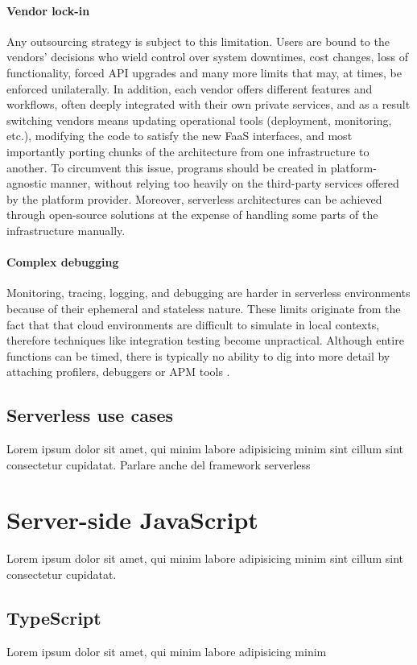 \paragraph{\textbf{Vendor lock-in}} Any outsourcing strategy is subject to this limitation.
Users are bound to the vendors' decisions who wield control over
system downtimes, cost changes, loss of functionality, forced API upgrades and many
more limits that may, at times, be enforced unilaterally.
In addition, each vendor offers different features and workflows,
often deeply integrated with their own private services,
and as a result switching vendors means updating operational tools (deployment, monitoring, etc.),
modifying the code to satisfy the new FaaS interfaces, and most importantly
porting chunks of the architecture from one infrastructure to another.
To circumvent this issue, programs should be created in platform-agnostic manner,
without relying too heavily on the third-party services offered by the platform provider.
Moreover, serverless architectures can be achieved through open-source solutions
at the expense of handling some parts of the infrastructure manually.

\paragraph{\textbf{Complex debugging}} Monitoring, tracing, logging, and debugging
are harder in serverless environments because of their ephemeral and stateless nature.
These limits originate from the fact that that cloud environments are difficult
to simulate in local contexts, therefore techniques like integration testing become unpractical.
Although entire functions can be timed, there is typically no
ability to dig into more detail by attaching profilers, debuggers or APM tools \cite{debug}.

\subsection{Serverless use cases}

Lorem ipsum dolor sit amet, qui minim labore adipisicing minim sint cillum sint consectetur cupidatat.
Parlare anche del framework serverless

\section{Server-side JavaScript}

Lorem ipsum dolor sit amet, qui minim labore adipisicing minim sint cillum sint consectetur cupidatat.

\subsection{TypeScript}

Lorem ipsum dolor sit amet, qui minim labore adipisicing minim

